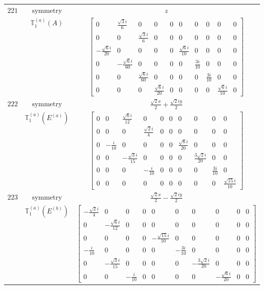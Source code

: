 \documentclass[fleqn,8pt,landscape]{jsarticle}
\begin{document}
\begin{longtable}{ccc}
$ 221 $ & $ \text{symmetry} $ & $ z $ \\
$  $ & $ \mathbb{T}_{1}^{(a)}(A) $ & $ \begin{bmatrix} 0 & \frac{\sqrt{3} i}{6} & 0 & 0 & 0 & 0 & 0 & 0 & 0 & 0 \\ 0 & 0 & \frac{\sqrt{3} i}{6} & 0 & 0 & 0 & 0 & 0 & 0 & 0 \\ - \frac{\sqrt{6} i}{20} & 0 & 0 & 0 & 0 & \frac{\sqrt{6} i}{10} & 0 & 0 & 0 & 0 \\ 0 & - \frac{\sqrt{6} i}{60} & 0 & 0 & 0 & 0 & \frac{3 i}{10} & 0 & 0 & 0 \\ 0 & 0 & \frac{\sqrt{6} i}{60} & 0 & 0 & 0 & 0 & \frac{3 i}{10} & 0 & 0 \\ 0 & 0 & 0 & \frac{\sqrt{6} i}{20} & 0 & 0 & 0 & 0 & \frac{\sqrt{6} i}{10} & 0 \end{bmatrix} $ \\ \hline
$ 222 $ & $ \text{symmetry} $ & $ \frac{\sqrt{2} x}{2} + \frac{\sqrt{2} i y}{2} $ \\
$  $ & $ \mathbb{T}_{1}^{(a)}(E^{(a)}) $ & $ \begin{bmatrix} 0 & 0 & \frac{\sqrt{6} i}{12} & 0 & 0 & 0 & 0 & 0 & 0 & 0 \\ 0 & 0 & 0 & \frac{\sqrt{2} i}{4} & 0 & 0 & 0 & 0 & 0 & 0 \\ 0 & - \frac{i}{10} & 0 & 0 & 0 & 0 & \frac{\sqrt{6} i}{20} & 0 & 0 & 0 \\ 0 & 0 & - \frac{\sqrt{3} i}{15} & 0 & 0 & 0 & 0 & \frac{3 \sqrt{2} i}{20} & 0 & 0 \\ 0 & 0 & 0 & - \frac{i}{10} & 0 & 0 & 0 & 0 & \frac{3 i}{10} & 0 \\ 0 & 0 & 0 & 0 & 0 & 0 & 0 & 0 & 0 & \frac{\sqrt{15} i}{10} \end{bmatrix} $ \\ \hline
$ 223 $ & $ \text{symmetry} $ & $ \frac{\sqrt{2} x}{2} - \frac{\sqrt{2} i y}{2} $ \\
$  $ & $ \mathbb{T}_{1}^{(a)}(E^{(b)}) $ & $ \begin{bmatrix} - \frac{\sqrt{2} i}{4} & 0 & 0 & 0 & 0 & 0 & 0 & 0 & 0 & 0 \\ 0 & - \frac{\sqrt{6} i}{12} & 0 & 0 & 0 & 0 & 0 & 0 & 0 & 0 \\ 0 & 0 & 0 & 0 & - \frac{\sqrt{15} i}{10} & 0 & 0 & 0 & 0 & 0 \\ - \frac{i}{10} & 0 & 0 & 0 & 0 & - \frac{3 i}{10} & 0 & 0 & 0 & 0 \\ 0 & - \frac{\sqrt{3} i}{15} & 0 & 0 & 0 & 0 & - \frac{3 \sqrt{2} i}{20} & 0 & 0 & 0 \\ 0 & 0 & - \frac{i}{10} & 0 & 0 & 0 & 0 & - \frac{\sqrt{6} i}{20} & 0 & 0 \end{bmatrix} $ \\ \hline

\end{longtable}
\end{document}
